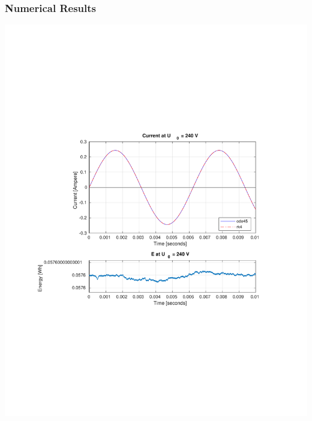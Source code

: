 \documentclass[aspectratio=1610]{beamer}
\begin{document}
\begin{frame}
\frametitle{Numerical Results}
      \centerline{\hspace*{0cm}\includegraphics[scale=0.5]{figs/240V + E.pdf}}
\end{frame}
\end{document}
